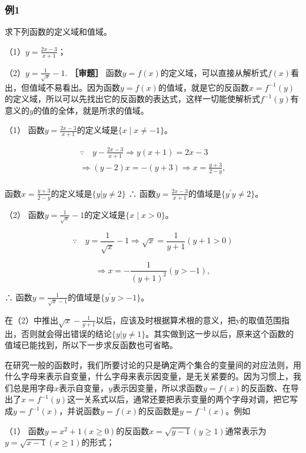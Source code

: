 \subsubsection{例1}

求下列函数的定义域和值域。

（1）\(y = \frac{2x - 3}{x + 1}\)；

（2）\(y = \frac{1}{\sqrt{x}} - 1.\) \textbf{［审题］}
函数\(y = f(x)\)的定义域，可以直接从解析式\(f(x)\)看出，但值域不易看出。因为函数\(y = f(x)\)的值域，就是它的反函数\(x = f^{-1}(y)\)的定义域，所以可以先找出它的反函数的表达式，这样一切能使解析式\(f^{-1}(y)\)有意义的\(y\)的值的全体，就是所求的值域。

 （1）
函数\(y = \frac{2x - 3}{x + 1}\)的定义域是\(\{x \mid x \neq -1\}\)。

\[
\begin{array}{l} \because \quad y - \frac{2 x - 3}{x + 1} \Rightarrow y (x + 1) = 2 x - 3 \\ \Rightarrow (y - 2) x = - (y + 3) \Rightarrow x = \frac{y + 3}{2 - y}, \\ \end{array}
\]

函数\(x = \frac{y + 3}{2 - y}\)的定义域是\(\{y|y\neq 2\}\) ∴
函数\(y=\frac{2x-3}{x+1}\)的值域是\(\{y^{\prime}y\neq2\}\)。

（2） 函数\(y = \frac{1}{\sqrt{x}} - 1\)的定义域是\(\{x \mid x > 0\}\)。

\[
\because \quad y = \frac{1}{\sqrt{x}} - 1 \Rightarrow \sqrt{x} = \frac{1}{y + 1} (y + 1 > 0)
\]

\[
\Rightarrow x = - \frac{1}{(y + 1)^{2}} (y > - 1),
\]

∴ 函数\(y=\frac{1}{\sqrt{x}-1}\)的值域是\(\{y^{\prime}y>-1\}\)。

在（2）中推出\(\sqrt{x}-\frac{1}{y+1}\)以后，应该及时根据算术根的意义，把y的取值范围指出，否则就会得出错误的结论\(\{y|y\neq1\}\)。其实做到这一步以后，原来这个函数的值域已能找到，所以下一步求反函数也可省略。

在研究一般的函数时，我们所要讨论的只是确定两个集合的变量间的对应法则，用什么字母来表示自变量，什么字母来表示因变量，是无关紧要的。因为习惯上，我们总是用字母\(x\)表示自变量，\(y\)表示因变量，所以求函数\(y = f(x)\)的反函数、在导出了\(x = f^{-1}(y)\)这一关系式以后，通常还要把表示变量的两个字母对调，把它写成\(y = f^{-1}(x)\)，并说函数\(y = f(x)\)的反函数是\(y = f^{-1}(x)\)。例如

（1）
函数\(y = x^2 + 1 (x \geqslant 0)\)的反函数\(x = \sqrt{y - 1} (y \geqslant 1)\)通常表示为\(y = \sqrt{x - 1} (x \geqslant 1)\)的形式；

